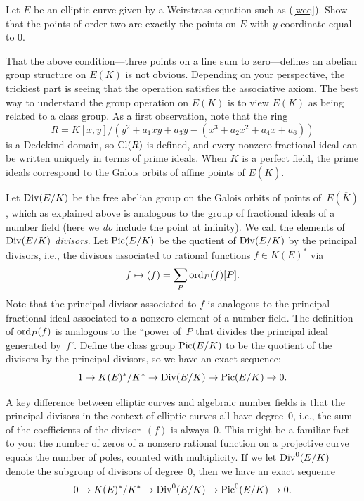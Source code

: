 \begin{exercise}\label{ex:ec2torsion}
	Let $E$ be an elliptic curve given by a
	Weirstrass equation such as (\ref{weq}).
	Show that the points of order two are exactly
	the points on $E$ with $y$-coordinate equal to
	$0$.
\end{exercise}

That the above condition---three points on a line sum to
zero---defines an abelian group structure on $E(K)$ is not obvious.
Depending on your perspective, the trickiest part is seeing that the
operation satisfies the associative axiom.  The best way to understand
the group operation on $E(K)$ is to view $E(K)$ as being related to a
class group.  As a first observation, note that the ring
$$
 R = K[x,y]/(y^2 +a_1 xy + a_3 y - (x^3 + a_2 x^2 + a_4 x + a_6))
$$
is a Dedekind domain, so $\operatorname{Cl}(R)$ is defined, and every nonzero
fractional ideal can be written uniquely in terms of prime ideals.
When $K$ is a perfect field, the prime ideals correspond to the Galois
orbits of affine points of $E(\overline{K})$.

Let $\operatorname{Div}(E/K)$ be the free abelian group on the Galois orbits of
points of~$E(\overline{K})$, which as explained above is analogous to
the group of fractional ideals of a number field (here we {\em do}
include the point at infinity).
We call the elements of $\operatorname{Div}(E/K)$
{\em divisors}.  Let $\operatorname{Pic}(E/K)$ be the quotient of $\operatorname{Div}(E/K)$ by the
principal divisors, i.e., the divisors associated to rational functions
$f\in K(E)^*$ via
$$
 f \mapsto (f) = \sum_{P} \operatorname{ord}_P(f) [P].
$$
Note that the principal divisor associated to $f$ is analogous to the
principal fractional ideal associated to a nonzero element of a number
field.  The definition of $\operatorname{ord}_P(f)$ is analogous to the ``power
of~$P$ that divides the principal ideal generated by~$f$''.
Define the class group $\operatorname{Pic}(E/K)$ to be the quotient of the
divisors by the principal divisors, so we have
an exact sequence:
$$
  1\to K(E)^*/K^* \to \operatorname{Div}(E/K) \to \operatorname{Pic}(E/K) \to 0.
$$

A key difference between elliptic curves and algebraic number fields
is that the principal divisors in the context of elliptic curves all
have degree~$0$, i.e., the sum of the coefficients of the
divisor~$(f)$ is always~$0$.  This might be a familiar fact to you:
the number of zeros of a nonzero rational function on a projective
curve equals the number of poles, counted with multiplicity.  If we
let $\operatorname{Div}^0(E/K)$ denote the subgroup of divisors of degree~$0$, then
we have an exact sequence
$$
  0\to K(E)^*/K^* \to \operatorname{Div}^0(E/K) \to \operatorname{Pic}^0(E/K) \to 0.
$$


